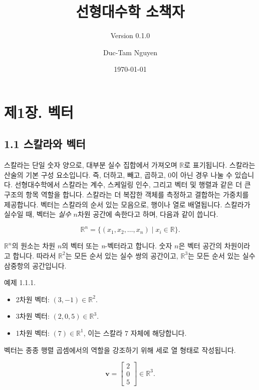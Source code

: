\documentclass[
  12pt,
  a4paper,
]{article}
\title{선형대수학 소책자}
\subtitle{Version 0.1.0}
\author{Duc-Tam Nguyen}
\date{\today}
\let\oldsection\section
\renewcommand{\section}{\clearpage\oldsection}
\begin{document}
\maketitle

{
\hypersetup{linkcolor=}
\setcounter{tocdepth}{2}
\tableofcontents
}
\section{제1장. 벡터}\label{chapter-1-vectors}

\subsection{1.1 스칼라와 벡터}\label{11-scalars-and-vectors}

스칼라는 단일 숫자 양으로, 대부분 실수 집합에서 가져오며 \(\mathbb{R}\)로 표기됩니다. 스칼라는 산술의 기본 구성 요소입니다. 즉, 더하고, 빼고, 곱하고, 0이 아닌 경우 나눌 수 있습니다. 선형대수학에서 스칼라는 계수, 스케일링 인수, 그리고 벡터 및 행렬과 같은 더 큰 구조의 항목 역할을 합니다. 스칼라는 더 복잡한 객체를 측정하고 결합하는 가중치를 제공합니다. 벡터는 스칼라의 순서 있는 모음으로, 행이나 열로 배열됩니다. 스칼라가 실수일 때, 벡터는 \emph{실수} \(n\)차원 공간에 속한다고 하며, 다음과 같이 씁니다.

\[\mathbb{R}^n = \{ (x_1, x_2, \dots, x_n) \mid x_i \in \mathbb{R} \}.\]

\(\mathbb{R}^n\)의 원소는 차원 \(n\)의 벡터 또는 \emph{n}-벡터라고 합니다. 숫자 \(n\)은 벡터 공간의 차원이라고 합니다. 따라서 \(\mathbb{R}^2\)는 모든 순서 있는 실수 쌍의 공간이고, \(\mathbb{R}^3\)는 모든 순서 있는 실수 삼중항의 공간입니다.

예제 1.1.1.

\begin{itemize}
\item
  2차원 벡터: \((3, -1) \in \mathbb{R}^2\).
\item
  3차원 벡터: \((2, 0, 5) \in \mathbb{R}^3\).
\item
  1차원 벡터: \((7) \in \mathbb{R}^1\), 이는 스칼라 \(7\) 자체에 해당합니다.
\end{itemize}

벡터는 종종 행렬 곱셈에서의 역할을 강조하기 위해 세로 열 형태로 작성됩니다.

\[\mathbf{v} = \begin{bmatrix} 2 \\ 0 \\ 5 \end{bmatrix} \in \mathbb{R}^3.\]
\end{document}
